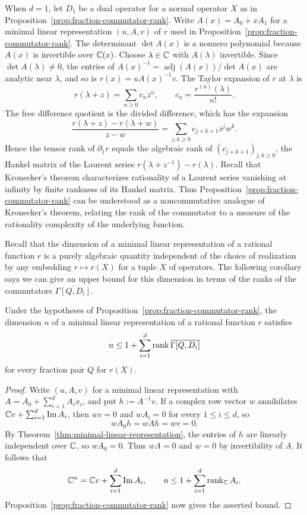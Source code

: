 When \(d=1\), let \(D_1\) be a dual operator for a normal operator \(X\) as in Proposition~\ref{prop:fraction-commutator-rank}.
Write $A(x)=A_0+xA_1$ for a minimal linear representation $(u,A,v)$ of $r$ used in Proposition~\ref{prop:fraction-commutator-rank}.
The determinant $\det A(x)$ is a nonzero polynomial because $A(x)$ is invertible over $\mathbb C(x)$.
Choose $\lambda\in\mathbb C$ with $A(\lambda)$ invertible.
Since $\det A(\lambda)\ne 0$, the entries of $A(x)^{-1}=\operatorname{adj}(A(x))/\det A(x)$ are analytic near $\lambda$, and so is $r(x)=uA(x)^{-1}v$.
The Taylor expansion of $r$ at $\lambda$ is
\[
 r(\lambda+z)=\sum_{n\geq 0}c_nz^n,
 \qquad c_n=\frac{r^{(n)}(\lambda)}{n!}.
\]
The free difference quotient is the divided difference, which has the expansion
\[
 \frac{r(\lambda+z)-r(\lambda+w)}{z-w}
 =\sum_{j,k\geq 0} c_{j+k+1}z^jw^k.
\]
Hence the tensor rank of $\partial_1 r$ equals the algebraic rank of $(c_{j+k+1})_{j,k\geq 0}$, the Hankel matrix of the Laurent series $r(\lambda+z^{-1})-r(\lambda)$.
Recall that Kronecker's theorem \cite[Articles~VII and~IX]{Kro81} characterizes rationality of a Laurent series vanishing at infinity by finite rankness of its Hankel matrix.
Thus Proposition~\ref{prop:fraction-commutator-rank} can be understood as a noncommutative analogue of Kronecker's theorem, relating the rank of the commutator to a measure of the rationality complexity of the underlying function.

Recall that the dimension of a minimal linear representation of a rational function $r$ is a purely algebraic quantity independent of the choice of realization by any embedding $r\mapsto r(X)$ for a tuple $X$ of operators.
The following corollary says we can give an upper bound for this dimension in terms of the ranks of the commutators $\overline{\Gamma[Q,D_i]}$.

\begin{corollary}\label{cor:minimal-representation-dimension}
Under the hypotheses of Proposition~\ref{prop:fraction-commutator-rank}, the dimension $n$ of a minimal linear representation of a rational function $r$ satisfies
\[
 n\leq 1+\sum_{i=1}^d\operatorname{rank}\overline{\Gamma[Q,D_i]}
\]
for every fraction pair $Q$ for $r(X)$.
\end{corollary}

\begin{proof}
Write $(u,A,v)$ for a minimal linear representation with $A=A_0+\sum_{i=1}^d A_ix_i$, and put $h:=A^{-1}v$.
If a complex row vector $w$ annihilates $\mathbb C v+\sum_{i=1}^d\operatorname{Im} A_i$, then $wv=0$ and $wA_i=0$ for every $1\leq i\leq d$, so
\[
 wA_0h=wAh=wv=0.
\]
By Theorem~\ref{thm:minimal-linear-representation}, the entries of $h$ are linearly independent over $\mathbb C$, so $wA_0=0$.
Thus $wA=0$ and $w=0$ by invertibility of $A$.
It follows that
\[
 \mathbb C^n=\mathbb C v+\sum_{i=1}^d\operatorname{Im} A_i,
 \qquad
 n\leq 1+\sum_{i=1}^d\operatorname{rank}_{\mathbb C}A_i.
\]
Proposition~\ref{prop:fraction-commutator-rank} now gives the asserted bound.
\end{proof}
